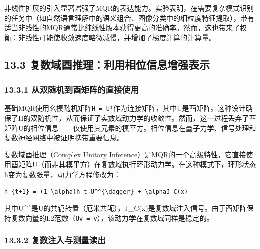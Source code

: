 \documentclass[
  12pt,
]{article}
\begin{document}
非线性扩展的引入显著增强了MQR的表达能力。实验表明，在需要复杂模式识别的任务中（如自然语言理解中的语义组合、图像分类中的细粒度特征提取），带有适当非线性的MQR通常比纯线性版本获得更高的准确率。然而，这也带来了权衡：非线性可能使收敛速度略微减慢，并增加了梯度计算的计算量。

\hypertarget{ux590dux6570ux57dfux9149ux63a8ux7406ux5229ux7528ux76f8ux4f4dux4fe1ux606fux589eux5f3aux8868ux793a}{%
\subsection{13.3
复数域酉推理：利用相位信息增强表示}\label{ux590dux6570ux57dfux9149ux63a8ux7406ux5229ux7528ux76f8ux4f4dux4fe1ux606fux589eux5f3aux8868ux793a}}

\hypertarget{ux4eceux53ccux968fux673aux5230ux9149ux77e9ux9635ux7684ux76f4ux63a5ux4f7fux7528}{%
\subsubsection{13.3.1
从双随机到酉矩阵的直接使用}\label{ux4eceux53ccux968fux673aux5230ux9149ux77e9ux9635ux7684ux76f4ux63a5ux4f7fux7528}}

基础MQR使用幺模随机矩阵\texttt{H\ =\ \textbar{}U\textbar{}²}作为连接矩阵，其中U是酉矩阵。这种设计确保了H的双随机性，从而保证了实数域动力学的收敛性。然而，这一过程丢弃了酉矩阵U的相位信息------仅使用其元素的模平方。相位信息在量子力学、信号处理和复数神经网络中被证明携带重要信息。

复数域酉推理（Complex Unitary
Inference）是MQR的一个高级特性，它直接使用酉矩阵U（而非其模平方）在复数域执行环形动力学。在这种模式下，环形状态h变为复数张量，动力学方程修改为：

\begin{verbatim}
h_{t+1} = (1-\alpha)h_t U^^{\dagger} + \alphaJ_C(x)
\end{verbatim}

其中U\^{}^{\dagger}是U的共轭转置（厄米共轭），J\_C(x)是复数域注入信号。由于酉矩阵保持复数向量的L2范数（\texttt{\textbar{}\textbar{}Uv\textbar{}\textbar{}\ =\ \textbar{}\textbar{}v\textbar{}\textbar{}}），该动力学在复数域同样是稳定的。

\hypertarget{ux590dux6570ux6ce8ux5165ux4e0eux6d4bux91cfux8bfbux51fa}{%
\subsubsection{13.3.2
复数注入与测量读出}\label{ux590dux6570ux6ce8ux5165ux4e0eux6d4bux91cfux8bfbux51fa}}
\end{document}
